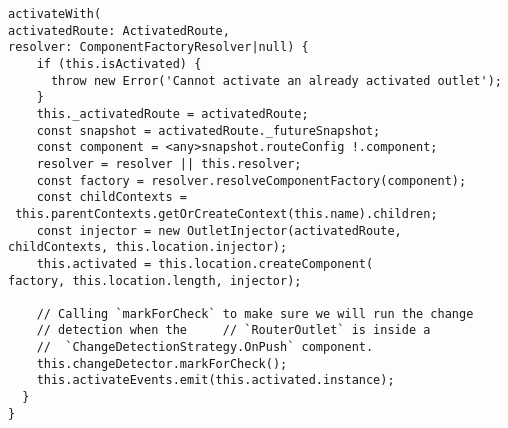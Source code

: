 \begin{verbatim}
activateWith(
activatedRoute: ActivatedRoute,
resolver: ComponentFactoryResolver|null) {
    if (this.isActivated) {
      throw new Error('Cannot activate an already activated outlet');
    }
    this._activatedRoute = activatedRoute;
    const snapshot = activatedRoute._futureSnapshot;
    const component = <any>snapshot.routeConfig !.component;
    resolver = resolver || this.resolver;
    const factory = resolver.resolveComponentFactory(component);
    const childContexts =
 this.parentContexts.getOrCreateContext(this.name).children;
    const injector = new OutletInjector(activatedRoute,
childContexts, this.location.injector);
    this.activated = this.location.createComponent(
factory, this.location.length, injector);

    // Calling `markForCheck` to make sure we will run the change
    // detection when the     // `RouterOutlet` is inside a
    //  `ChangeDetectionStrategy.OnPush` component.
    this.changeDetector.markForCheck();
    this.activateEvents.emit(this.activated.instance);
  }
}
\end{verbatim}
